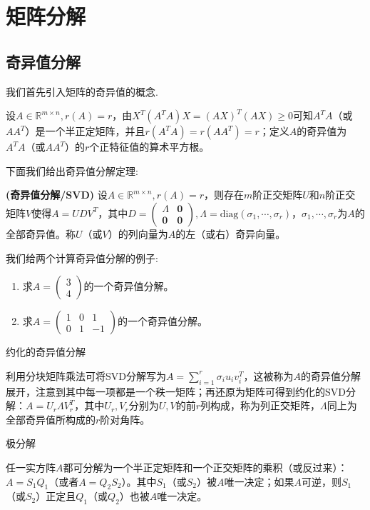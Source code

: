 \section{矩阵分解}
\subsection{奇异值分解}
我们首先引入矩阵的奇异值的概念.
\begin{definition}
设$A\in \mathbb R^{m\times n},r(A)=r$，由$X^T(A^TA)X=(AX)^T(AX)\geq 0$可知$A^TA$（或$AA^T$）是一个半正定矩阵，并且$r(A^TA)=r(AA^T)=r$；定义$A$的奇异值为$A^TA$（或$AA^T$）的$r$个正特征值的算术平方根。
\end{definition}
下面我们给出奇异值分解定理:
\begin{theorem}{\textbf{(奇异值分解/SVD)}}\label{Thm2.1}
设$A\in\mathbb R^{m\times n},r(A)=r$，则存在$m$阶正交矩阵$U$和$n$阶正交矩阵$V$使得$A=UDV^T$，其中$D=\begin{pmatrix} \Lambda & \mathbf 0 \\ \mathbf 0 & \mathbf 0 \end{pmatrix},\Lambda=\mathrm{diag}(\sigma_1,\cdots,\sigma_r)$，$\sigma_1,\cdots,\sigma_r$为$A$的全部奇异值。称$U$（或$V$）的列向量为$A$的左（或右）奇异向量。
\end{theorem}
我们给两个计算奇异值分解的例子:
\begin{example}
\begin{enumerate}
    \item 求$A=\begin{pmatrix} 3 \\ 4 \end{pmatrix}$的一个奇异值分解。 
    \item 求$A=\begin{pmatrix} 1&0&1 \\ 
        0&1&-1 \end{pmatrix}$的一个奇异值分解。
\end{enumerate}
\end{example}
约化的奇异值分解
\begin{definition}
利用分块矩阵乘法可将SVD分解写为$A=\sum\limits_{i=1}^r \sigma_iu_iv_i^T$，这被称为$A$的奇异值分解展开，注意到其中每一项都是一个秩一矩阵；再还原为矩阵可得到约化的SVD分解：$A=U_r\Lambda V_r^T$，其中$U_r,V_r$分别为$U,V$的前$r$列构成，称为列正交矩阵，$\Lambda$同上为全部奇异值所构成的$r$阶对角阵。        
\end{definition}
极分解
\begin{definition}
任一实方阵$A$都可分解为一个半正定矩阵和一个正交矩阵的乘积（或反过来）：$A=S_1Q_1$（或者$A=Q_2S_2$）。其中$S_1$（或$S_2$）被$A$唯一决定；如果$A$可逆，则$S_1$（或$S_2$）正定且$Q_1$（或$Q_2$）也被$A$唯一决定。
\end{definition}